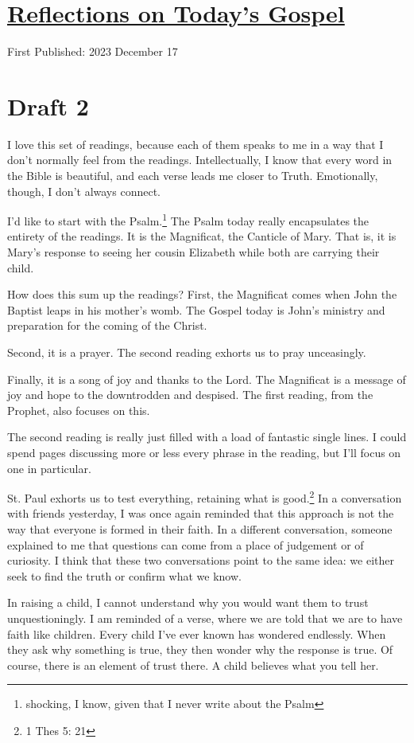 \documentclass[12pt]{article}[titlepage]
\newcommand{\1}{\={a}}
\newcommand{\2}{\={e}}
\newcommand{\3}{\={\i}}
\newcommand{\4}{\=o}
\newcommand{\5}{\=u}
\newcommand{\6}{\={A}}
\renewcommand{\,}{\textsuperscript{,}}
\begin{document}
\doublespacing
\section{\href{reflections-on-readings-3-advent-b-23.html}{Reflections on Today's Gospel}}
First Published: 2023 December 17

\section{Draft 2}
I love this set of readings, because each of them speaks to me in a way that I don't normally feel from the readings.
Intellectually, I know that every word in the Bible is beautiful, and each verse leads me closer to Truth.
Emotionally, though, I don't always connect.

I'd like to start with the Psalm.\footnote{shocking, I know, given that I never write about the Psalm}
The Psalm today really encapsulates the entirety of the readings.
It is the Magnificat, the Canticle of Mary.
That is, it is Mary's response to seeing her cousin Elizabeth while both are carrying their child.

How does this sum up the readings?
First, the Magnificat comes when John the Baptist leaps in his mother's womb.
The Gospel today is John's ministry and preparation for the coming of the Christ.

Second, it is a prayer.
The second reading exhorts us to pray unceasingly.

Finally, it is a song of joy and thanks to the Lord.
The Magnificat is a message of joy and hope to the downtrodden and despised.
The first reading, from the Prophet, also focuses on this.

The second reading is really just filled with a load of fantastic single lines.
I could spend pages discussing more or less every phrase in the reading, but I'll focus on one in particular.

St. Paul exhorts us to test everything, retaining what is good.\footnote{1 Thes 5: 21}
In a conversation with friends yesterday, I was once again reminded that this approach is not the way that everyone is formed in their faith.
In a different conversation, someone explained to me that questions can come from a place of judgement or of curiosity.
I think that these two conversations point to the same idea: we either seek to find the truth or confirm what we know.

In raising a child, I cannot understand why you would want them to trust unquestioningly.
I am reminded of a verse, where we are told that we are to have faith like children.
Every child I've ever known has wondered endlessly.
When they ask why something is true, they then wonder why the response is true.
Of course, there is an element of trust there.
A child believes what you tell her.
\end{document}
